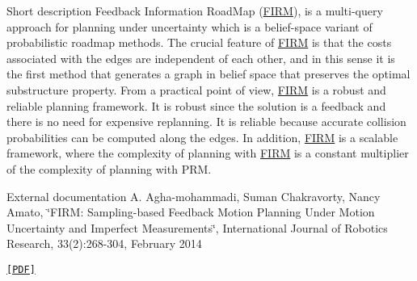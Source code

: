 \label{class_f_i_r_m_FIRM}%
\hypertarget{class_f_i_r_m_FIRM}{}%
 \begin{DoxyParagraph}{\-Short description}
\-Feedback \-Information \-Road\-Map (\hyperlink{class_f_i_r_m}{\-F\-I\-R\-M}), is a multi-\/query approach for planning under uncertainty which is a belief-\/space variant of probabilistic roadmap methods. \-The crucial feature of \hyperlink{class_f_i_r_m}{\-F\-I\-R\-M} is that the costs associated with the edges are independent of each other, and in this sense it is the first method that generates a graph in belief space that preserves the optimal substructure property. \-From a practical point of view, \hyperlink{class_f_i_r_m}{\-F\-I\-R\-M} is a robust and reliable planning framework. \-It is robust since the solution is a feedback and there is no need for expensive replanning. \-It is reliable because accurate collision probabilities can be computed along the edges. \-In addition, \hyperlink{class_f_i_r_m}{\-F\-I\-R\-M} is a scalable framework, where the complexity of planning with \hyperlink{class_f_i_r_m}{\-F\-I\-R\-M} is a constant multiplier of the complexity of planning with \-P\-R\-M.
\end{DoxyParagraph}
\begin{DoxyParagraph}{\-External documentation}
\-A. \-Agha-\/mohammadi, \-Suman \-Chakravorty, \-Nancy \-Amato, \char`\"{}\-F\-I\-R\-M\-: Sampling-\/based Feedback Motion Planning Under Motion
   Uncertainty and Imperfect Measurements\char`\"{}, \-International \-Journal of \-Robotics \-Research, 33(2)\-:268-\/304, \-February 2014
\end{DoxyParagraph}
\href{http://www.mit.edu/~aliagha/Web/pubpdfs/2014.Ali.Suman.ea.IJRR_FIRM.pdf}{\tt \mbox{[}\-P\-D\-F\mbox{]}} 

